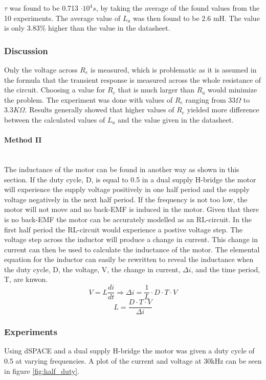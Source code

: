 $\tau$ was found to be 0.713 $\cdot 10^4 s$, by taking the average of the found values from the 10 experiments.
The average value of $L_a$ was then found to be 2.6 mH. The value is only $3.83\%$ higher than the value in the datasheet.

\subsubsection{Discussion}
Only the voltage across $R_e$ is measured, which is problematic as it is assumed in the formula that the transient response is measured across the whole resistance of the circuit. Choosing a value for $R_e$ that is much larger than $R_a$ would minimize the problem.
The experiment was done with values of $R_e$ ranging from $33\Omega$ to $3.3K\Omega$.
Results generally showed that higher values of $R_e$ yielded more difference between the calculated values of $L_a$ and the value given in the datasheet.



\paragraph{Method II}~\\
The inductance of the motor can be found in another way as shown in this section. 
If the duty cycle, D, is equal to 0.5 in a dual supply H-bridge the motor will experience the supply voltage positively in one half period and the supply voltage negatively in the next half period.
If the frequency is not too low, the motor will not move and no back-EMF is induced in the motor. 
Given that there is no back-EMF the motor can be accurately modelled as an RL-circuit.  
In the first half period the RL-circuit would experience a postive voltage step. 
The voltage step across the inductor will produce a change in current.
This change in current can then be used to calculate the inductance of the motor.
The elemental equation for the inductor can easily be rewritten to reveal the inductance when the duty cycle, D, the voltage, V, the change in current, $\Delta i$, and the time period, T, are knwon. 
$$V = L \frac{di}{dt} \Rightarrow \Delta i = \frac{1}{L} \cdot D \cdot T \cdot V $$
$$L = \frac{D \cdot T \cdot V}{\Delta i}$$


\subsubsection{Experiments}
Using dSPACE and a dual supply H-bridge the motor was given a duty cycle of 0.5 at varying frequencies.
A plot of the current and voltage at 30kHz can be seen in figure \ref{fig:half_duty}.


